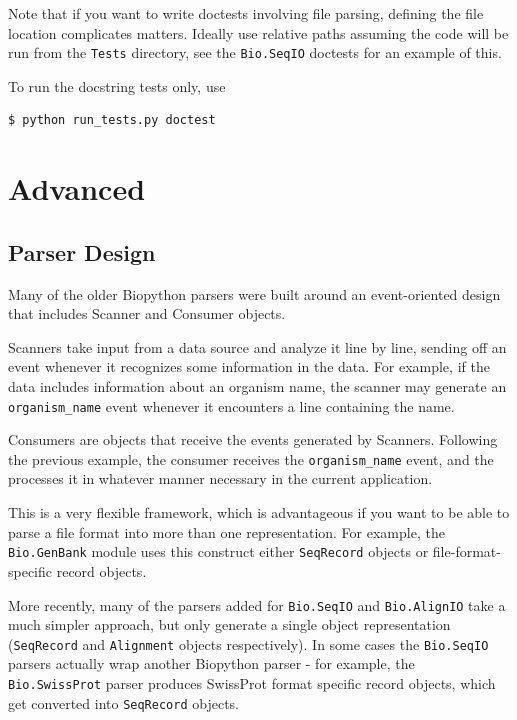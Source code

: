 \documentclass{report}
\begin{document}
Note that if you want to write doctests involving file parsing, defining
the file location complicates matters.  Ideally use relative paths assuming
the code will be run from the \verb|Tests| directory, see the
\verb|Bio.SeqIO| doctests for an example of this.

To run the docstring tests only, use
\begin{verbatim}
$ python run_tests.py doctest
\end{verbatim}

\chapter{Advanced}
\label{chapter:advanced}

\section{Parser Design}

Many of the older Biopython parsers were built around an event-oriented
design that includes Scanner and Consumer objects.

Scanners take input from a data source and analyze it line by line,
sending off an event whenever it recognizes some information in the
data.  For example, if the data includes information about an organism
name, the scanner may generate an \verb|organism_name| event whenever it
encounters a line containing the name.

Consumers are objects that receive the events generated by Scanners.
Following the previous example, the consumer receives the
\verb|organism_name| event, and the processes it in whatever manner
necessary in the current application.

This is a very flexible framework, which is advantageous if you want to
be able to parse a file format into more than one representation.  For
example, the \verb|Bio.GenBank| module uses this construct either
\verb|SeqRecord| objects or file-format-specific record objects.

More recently, many of the parsers added for \verb|Bio.SeqIO| and
\verb|Bio.AlignIO| take a much simpler approach, but only generate a
single object representation (\verb|SeqRecord| and \verb|Alignment| objects
respectively). In some cases the \verb|Bio.SeqIO| parsers actually wrap
another Biopython parser - for example, the \verb|Bio.SwissProt| parser
produces SwissProt format specific record objects, which get converted
into \verb|SeqRecord| objects.
\end{document}
